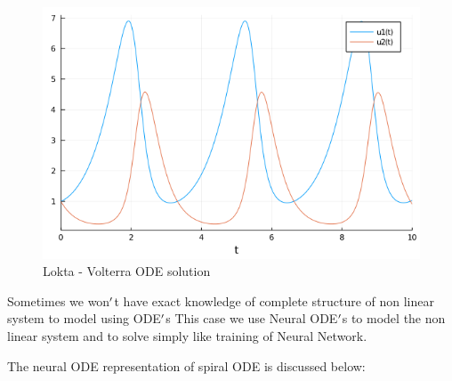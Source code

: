 \documentclass[12pt,a4paper]{article}
\begin{document}
\begin{figure}
\centering
\includegraphics{img/lokta.png}
\caption{Lokta - Volterra ODE solution}
\end{figure}


Sometimes we won\ensuremath{\rq}t have exact knowledge of complete structure of non linear system to model using ODE\ensuremath{\rq}s This case we  use Neural ODE\ensuremath{\rq}s to model the non linear system and to solve simply like training of Neural Network.

The neural ODE representation of spiral ODE is discussed below:
\end{document}
